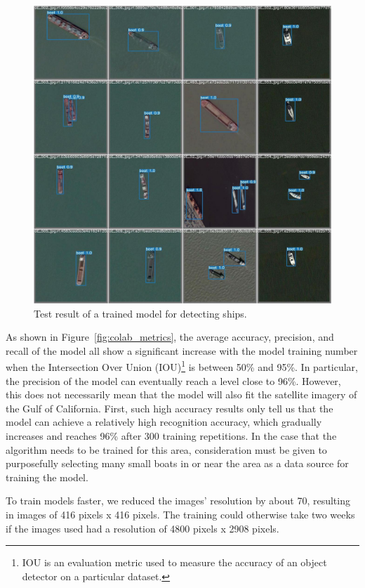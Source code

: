 \begin{figure}[t]
    \centerline{\includegraphics[width=\columnwidth]{img/test_batch1_pred.jpeg}}
    \caption{Test result of a trained model for detecting ships.}
    \label{fig:test_batch1_pred}
\end{figure}

As shown in Figure~\ref{fig:colab_metrics}, the average accuracy, precision, and recall of the model all show a significant increase with the model training number when the Intersection Over Union (IOU)\footnote{IOU is an evaluation metric used to measure the accuracy of an object detector on a particular dataset.} is between 50\% and 95\%. In particular, the precision of the model can eventually reach a level close to 96\%. However, this does not necessarily mean that the model will also fit the satellite imagery of the Gulf of California. First, such high accuracy results only tell us that the model can achieve a relatively high recognition accuracy, which gradually increases and reaches 96\% after 300 training repetitions. In the case that the algorithm needs to be trained for this area, consideration must be given to purposefully selecting many small boats in or near the area as a data source for training the model. 

To train models faster, we reduced the images' resolution by about 70, resulting in images of 416 pixels x 416 pixels. The training could otherwise take two weeks if the images used had a resolution of 4800 pixels x 2908 pixels.

